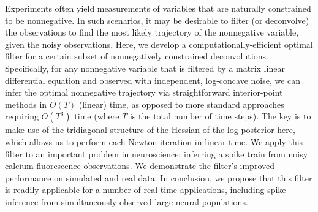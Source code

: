 Experiments often yield measurements of variables that are naturally constrained to be nonnegative. In such scenarios, it may be desirable to filter (or deconvolve) the observations to find the most likely trajectory of the nonnegative variable, given the noisy observations. Here, we develop a computationally-efficient optimal filter for a certain subset of nonnegatively constrained deconvolutions.  Specifically, for any nonnegative variable that is filtered by a matrix linear differential equation and observed with independent, log-concave noise, we can infer the optimal nonnegative trajectory via straightforward interior-point methods in $O(T)$ (linear) time, as opposed to more standard approaches requiring $O(T^3)$ time (where $T$ is the total number of time steps).  The key is to make use of the tridiagonal structure of the Hessian of the log-posterior here, which allows us to perform each Newton iteration in linear time.  We apply this filter to an important problem in neuroscience: inferring a spike train from noisy calcium fluorescence observations. We demonstrate the filter's improved performance on simulated and real data. In conclusion, we propose that this filter is readily applicable for a number of real-time applications, including spike inference from simultaneously-observed large neural populations.


